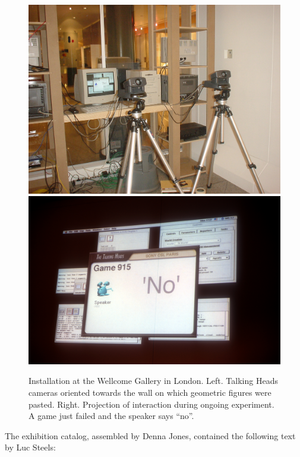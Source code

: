 \begin{figure}[htbp]
  \centerline{\includegraphics[width=.55\textwidth]{chap9/figs/london-heads} 
\includegraphics[width=.44\textwidth]{chap9/figs/screen}}
\caption{\label{fig:london-heads} 
Installation at the Wellcome Gallery in London. Left. Talking Heads cameras oriented towards the wall on which 
geometric figures were pasted. Right. Projection of interaction during ongoing experiment. A game just failed and 
the speaker says ``no''.} 
\end{figure}

The exhibition catalog, assembled by Denna Jones, contained the following text by Luc Steels: 

